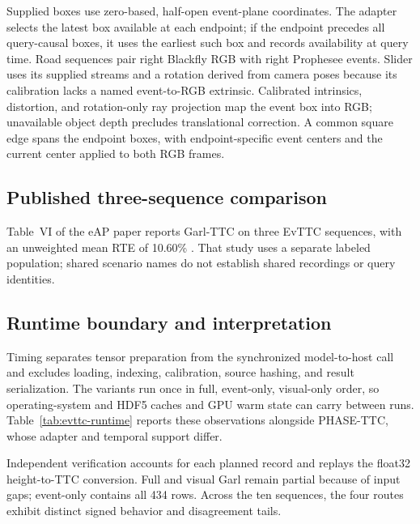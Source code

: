 Supplied boxes use zero-based, half-open event-plane coordinates. The adapter selects the latest box available at each endpoint; if the endpoint precedes all query-causal boxes, it uses the earliest such box and records availability at query time. Road sequences pair right Blackfly RGB with right Prophesee events. Slider uses its supplied streams and a rotation derived from camera poses because its calibration lacks a named event-to-RGB extrinsic. Calibrated intrinsics, distortion, and rotation-only ray projection map the event box into RGB; unavailable object depth precludes translational correction. A common square edge spans the endpoint boxes, with endpoint-specific event centers and the current center applied to both RGB frames.


\subsection{Published three-sequence comparison}
Table~VI of the eAP paper reports Garl-TTC on three EvTTC sequences, with an unweighted mean RTE of 10.60\% \citep{eap}. That study uses a separate labeled population; shared scenario names do not establish shared recordings or query identities. 



\subsection{Runtime boundary and interpretation}



Timing separates tensor preparation from the synchronized model-to-host call and excludes loading, indexing, calibration, source hashing, and result serialization. The variants run once in full, event-only, visual-only order, so operating-system and HDF5 caches and GPU warm state can carry between runs. Table~\ref{tab:evttc-runtime} reports these observations alongside PHASE-TTC, whose adapter and temporal support differ.

Independent verification accounts for each planned record and replays the float32 height-to-TTC conversion. Full and visual Garl remain partial because of input gaps; event-only contains all 434 rows. Across the ten sequences, the four routes exhibit distinct signed behavior and disagreement tails. 

\clearpage
